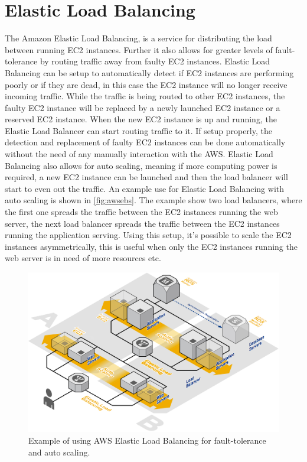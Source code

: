 \documentclass[11pt]{report}
\begin{document}
\section{Elastic Load Balancing}
The Amazon Elastic Load Balancing, is a service for distributing the load between running EC2 instances. Further it also allows for greater levels of fault-tolerance by routing traffic away from faulty EC2 instances. Elastic Load Balancing can be setup to automatically detect if EC2 instances are performing poorly or if they are dead, in this case the EC2 instance will no longer receive incoming traffic. While the traffic is being routed to other EC2 instances, the faulty EC2 instance will be replaced by a newly launched EC2 instance or a reserved EC2 instance. When the new EC2 instance is up and running, the Elastic Load Balancer can start routing traffic to it. If setup properly, the detection and replacement of faulty EC2 instances can be done automatically without the need of any manually interaction with the AWS. Elastic Load Balancing also allows for auto scaling, meaning if more computing power is required, a new EC2 instance can be launched and then the load balancer will start to even out the traffic. An example use for Elastic Load Balancing with auto scaling is shown in \autoref{fig:awsebs}. The example show two load balancers, where the first one spreads the traffic between the EC2 instances running the web server, the next load balancer spreads the traffic between the EC2 instances running the application serving. Using this setup, it's possible to scale the EC2 instances asymmetrically, this is useful when only the EC2 instances running the web server is in need of more resources etc.

\begin{figure}[H]
\centering
\includegraphics[scale=.375]{../GFX/aws_elb_web.jpg}
\caption{Example of using AWS Elastic Load Balancing for fault-tolerance and auto scaling.}
\label{fig:awsebs}
\end{figure}
\end{document}
